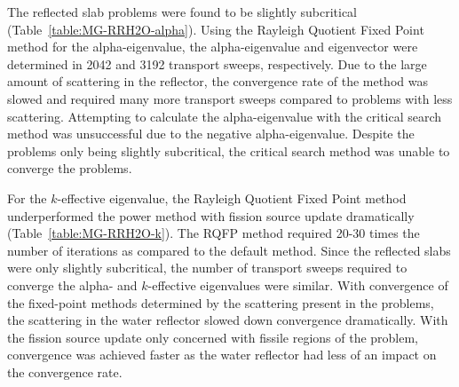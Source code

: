 The reflected slab problems were found to be slightly subcritical (Table~\ref{table:MG-RRH2O-alpha}). Using the Rayleigh Quotient Fixed Point method for the alpha-eigenvalue, the alpha-eigenvalue and eigenvector were determined in 2042 and 3192 transport sweeps, respectively. Due to the large amount of scattering in the reflector, the convergence rate of the method was slowed and required many more transport sweeps compared to problems with less scattering. Attempting to calculate the alpha-eigenvalue with the critical search method was unsuccessful due to the negative alpha-eigenvalue. Despite the problems only being slightly subcritical, the critical search method was unable to converge the problems.

For the $k$-effective eigenvalue, the Rayleigh Quotient Fixed Point method underperformed the power method with fission source update dramatically (Table~\ref{table:MG-RRH2O-k}). The RQFP method required 20-30 times the number of iterations as compared to the default method. Since the reflected slabs were only slightly subcritical, the number of transport sweeps required to converge the alpha- and $k$-effective eigenvalues were similar. With convergence of the fixed-point methods determined by the scattering present in the problems, the scattering in the water reflector slowed down convergence dramatically. With the fission source update only concerned with fissile regions of the problem, convergence was achieved faster as the water reflector had less of an impact on the convergence rate.

